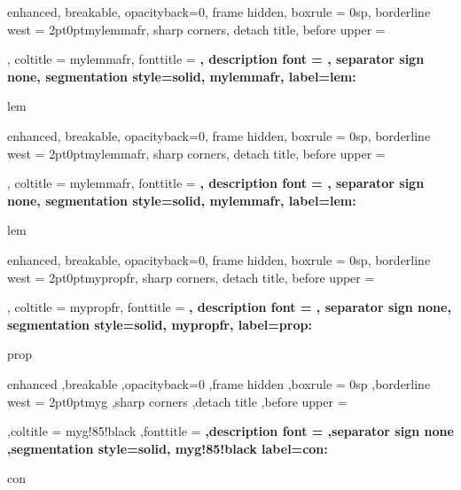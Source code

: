 {%
	enhanced,
	breakable,
	opacityback=0,
	frame hidden,
	boxrule = 0sp,
	borderline west = {2pt}{0pt}{mylemmafr},
	sharp corners,
	detach title,
	before upper = \tcbtitle\par\smallskip,
	coltitle = mylemmafr,
	fonttitle = \bfseries\sffamily,
	description font = \mdseries,
	separator sign none,
	segmentation style={solid, mylemmafr},
    label={lem:\thetcbcounter}
}
{lem}

{%
	enhanced,
	breakable,
	opacityback=0,
	frame hidden,
	boxrule = 0sp,
	borderline west = {2pt}{0pt}{mylemmafr},
	sharp corners,
	detach title,
	before upper = \tcbtitle\par\smallskip,
	coltitle = mylemmafr,
	fonttitle = \bfseries\sffamily,
	description font = \mdseries,
	separator sign none,
	segmentation style={solid, mylemmafr},
    label={lem:\thetcbcounter}
}
{lem}



{%
	enhanced,
	breakable,	
	opacityback=0,
	frame hidden,
	boxrule = 0sp,
	borderline west = {2pt}{0pt}{mypropfr},
	sharp corners,
	detach title,
	before upper = \tcbtitle\par\smallskip,
	coltitle = mypropfr,
	fonttitle = \bfseries\sffamily,
	description font = \mdseries,
	separator sign none,
	segmentation style={solid, mypropfr},
    label={prop:\thetcbcounter}
}
{prop}

{%
	enhanced
	,breakable
	,opacityback=0
	,frame hidden
	,boxrule = 0sp
	,borderline west = {2pt}{0pt}{myg}
	,sharp corners
	,detach title
	,before upper = \tcbtitle\par\smallskip
	,coltitle = myg!85!black
	,fonttitle = \bfseries\sffamily
	,description font = \mdseries
	,separator sign none
	,segmentation style={solid, myg!85!black}
    label={con:\thetcbcounter}
}
{con}
\makeatother

